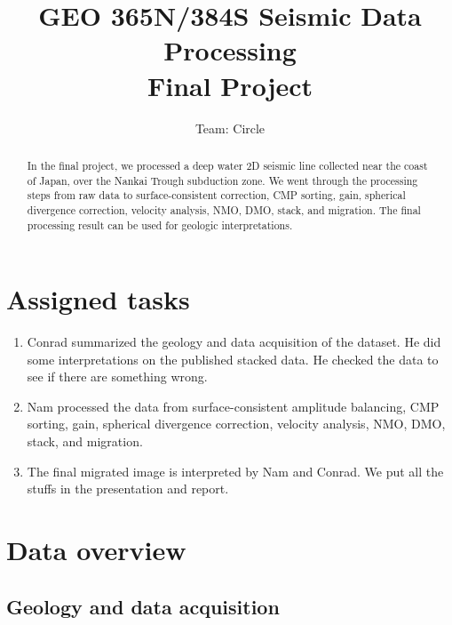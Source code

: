 \author{Team: Circle}
\title{GEO 365N/384S Seismic Data Processing \\ Final Project}

\begin{abstract}

In the final project, we processed a deep water 2D seismic line collected near the coast of Japan, over the Nankai Trough subduction zone. We went through the processing steps from raw data to surface-consistent correction, CMP sorting, gain, spherical divergence correction, velocity analysis, NMO, DMO, stack, and migration. The final processing result can be used for geologic interpretations.
  
\end{abstract}

\section{Assigned tasks}

\begin{enumerate}

\item Conrad summarized the geology and data acquisition of the dataset. He did some interpretations on the published stacked data. He checked the data to see if there are something wrong.

\item Nam processed the data from surface-consistent amplitude balancing, CMP sorting, gain, spherical divergence correction, velocity analysis, NMO, DMO, stack, and migration.

\item The final migrated image is interpreted by Nam and Conrad. We put all the stuffs in the presentation and report. 

\end{enumerate}

\section{Data overview}

\subsection{Geology and data acquisition}

